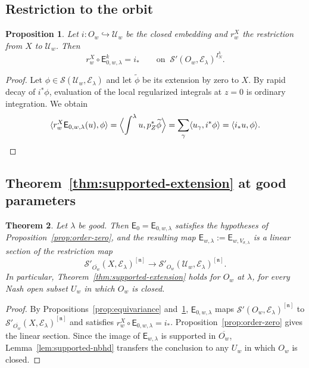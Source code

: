 \documentclass[a4paper,12pt]{amsart}
\numberwithin{equation}{section}
\newtheorem{theorem}{Theorem}[section]
\newtheorem{proposition}[theorem]{Proposition}
\theoremstyle{definition}
\theoremstyle{remark}
\newcommand{\fn}{\mathfrak n}
\newcommand{\IN}{I_N}
\newcommand{\mcU}{\mathcal U}
\newcommand{\mcS}{\mathcal S}
\newcommand{\mcE}{\mathcal E}
\newcommand{\E}{\mathsf E}
\begin{document}
\subsection{Restriction to the orbit}\label{ssec:right-inverse}

\begin{proposition}\label{prop:right-inverse}
Let $i:O_w\hookrightarrow\mcU_w$ be the closed embedding and $r^X_w$ the restriction from $X$ to $\mcU_w$. Then
\[
 r^X_w\circ\E^k_{0,w,\lambda}=i_*\qquad\text{on }\ \mcS'(O_w,\mcE_\lambda)^{\IN^k}.
\]
\end{proposition}

\begin{proof}
Let $\phi\in\mcS(\mcU_w,\mcE_\lambda)$ and let $\widetilde\phi$ be its extension by zero to $X$. By rapid decay of $i^*\phi$, evaluation of the local regularized integrals at $z=0$ is ordinary integration. We obtain
\[
\begin{aligned}
 \langle r_w^X\E_{0,w,\lambda}(u),\phi\rangle
 =\Bigl\langle\int^\lambda u,p_Z^*\widetilde\phi\Bigr\rangle
 =\sum_\gamma\langle u_\gamma,i^*\phi\rangle
 =\langle i_*u,\phi\rangle.
\end{aligned}
\]
\end{proof}

\subsection{Theorem~\ref{thm:supported-extension} at good parameters}\label{ssec:thmB-good}

\begin{theorem}\label{thm:B-good}
Let $\lambda$ be good. Then $\E_0=\E_{0,w,\lambda}$ satisfies the hypotheses of Proposition~\ref{prop:order-zero}, and the resulting map $\E_{w,\lambda}:=\E_{w,V_{\sigma,\lambda}}$ is a linear section of the restriction map
\[
 \mcS'_{\overline{O_w}}(X,\mcE_\lambda)^{[\fn]}\to\mcS'_{O_w}(\mcU_w,\mcE_\lambda)^{[\fn]}.
\]
In particular, Theorem~\ref{thm:supported-extension} holds for $O_w$ at $\lambda$, for every Nash open subset $U_w$ in which $O_w$ is closed.
\end{theorem}

\begin{proof}
By Propositions~\ref{prop:equivariance} and~\ref{prop:right-inverse}, $\E_{0,w,\lambda}$ maps $\mcS'(O_w,\mcE_\lambda)^{[\fn]}$ to $\mcS'_{\overline{O_w}}(X,\mcE_\lambda)^{[\fn]}$ and satisfies $r^X_w\circ\E_{0,w,\lambda}=i_*$. Proposition~\ref{prop:order-zero} gives the linear section. Since the image of $\E_{w,\lambda}$ is supported in $\overline{O_w}$, Lemma~\ref{lem:supported-nbhd} transfers the conclusion to any $U_w$ in which $O_w$ is closed.
\end{proof}
\end{document}
